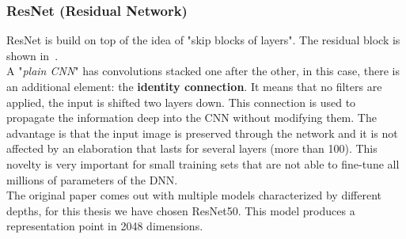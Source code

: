 \subsubsection*{ResNet (Residual Network)}
ResNet\cite{resNet_paper} is build on top of the idea of "skip blocks of layers". The residual block is shown in~.\\
A "\textit{plain CNN}" has convolutions stacked one after the other, in this case, there is an additional element: the \textbf{identity connection}. It means that no filters are applied, the input is shifted two layers down. This connection is used to propagate the information deep into the CNN without modifying them. The advantage is that the input image is preserved through the network and it is not affected by an elaboration that lasts for several layers (more than 100). This novelty is very important for small training sets that are not able to fine-tune all millions of parameters of the DNN.\\
The original paper comes out with multiple models characterized by different depths, for this thesis we have chosen ResNet50\cite{resNet_model}. This model produces a representation point in 2048 dimensions.

